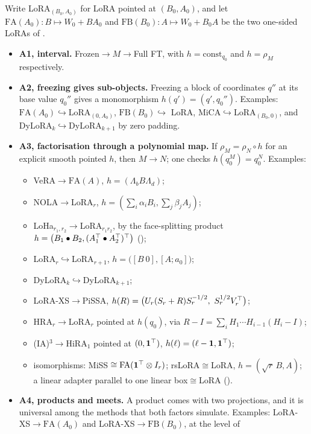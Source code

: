 Write LoRA$_{(B_0,A_0)}$ for LoRA pointed at $(B_0,A_0)$, and let $\mathrm{FA}(A_0):B\mapsto W_0+BA_0$ and
$\mathrm{FB}(B_0):A\mapsto W_0+B_0A$ be the two one-sided LoRAs of .
\begin{itemize}
  \item \textbf{A1, interval.} Frozen${}\to M\to{}$Full FT, with $h=\mathrm{const}_{q_0}$ and $h=\rho_M$ respectively.
  \item \textbf{A2, freezing gives sub-objects.} Freezing a block of coordinates $q''$ at its base value $q_0''$
  gives a monomorphism $h(q')=(q',q_0'')$. Examples: $\mathrm{FA}(A_0)\hookrightarrow{}$LoRA$_{(0,A_0)}$, $\mathrm{FB}(B_0)\hookrightarrow{}$
  LoRA, MiCA${}\hookrightarrow{}$LoRA$_{(B_0,0)}$, and DyLoRA$_k\hookrightarrow{}$DyLoRA$_{k+1}$ by zero padding.
  \item \textbf{A3, factorisation through a polynomial map.} If $\rho_M=\rho_N\circ h$ for an explicit smooth pointed $h$,
  then $M\to N$; one checks $h(q_0^M)=q_0^N$. Examples:
  \begin{itemize}
    \item VeRA${}\to\mathrm{FA}(A)$, $h=(\Lambda_bB\Lambda_d)$;
    \item NOLA${}\to{}$LoRA$_r$, $h=(\sum_i\alpha_iB_i,\sum_j\beta_jA_j)$;
    \item LoHa$_{r_1,r_2}\to{}$LoRA$_{r_1r_2}$, by the face-splitting product
    $h=\big(B_1\bullet B_2,(A_1^{\top}\bullet A_2^{\top})^{\top}\big)$ ();
    \item LoRA$_r\hookrightarrow{}$LoRA$_{r+1}$, $h=\big([B\ 0],[A;a_0]\big)$;
    \item DyLoRA$_k\hookrightarrow{}$DyLoRA$_{k+1}$;
    \item LoRA-XS${}\to{}$PiSSA, $h(R)=\big(U_r(S_r+R)S_r^{-1/2},\ S_r^{1/2}V_r\T\big)$;
    \item HRA$_r\to{}$LoRA$_r$ pointed at $h(q_0)$, via $R-I=\sum_iH_1\cdots H_{i-1}(H_i-I)$;
    \item (IA)$^3\to{}$HiRA$_1$ pointed at $(0,\mathbf 1^{\top})$, $h(\ell)=(\ell-\mathbf 1,\mathbf 1^{\top})$;
    \item isomorphisms: MiSS${}\cong\mathrm{FA}(\mathbf 1^{\top}\otimes I_r)$; rsLoRA${}\cong{}$LoRA, $h=(\sqrt r\,B,A)$; a
    linear adapter parallel to one linear box${}\cong{}$LoRA ().
  \end{itemize}
  \item \textbf{A4, products and meets.} A product comes with two projections, and it is universal among the methods
  that both factors simulate. Examples: LoRA-XS${}\to\mathrm{FA}(A_0)$ and LoRA-XS${}\to\mathrm{FB}(B_0)$, at the level of

\end{itemize}
